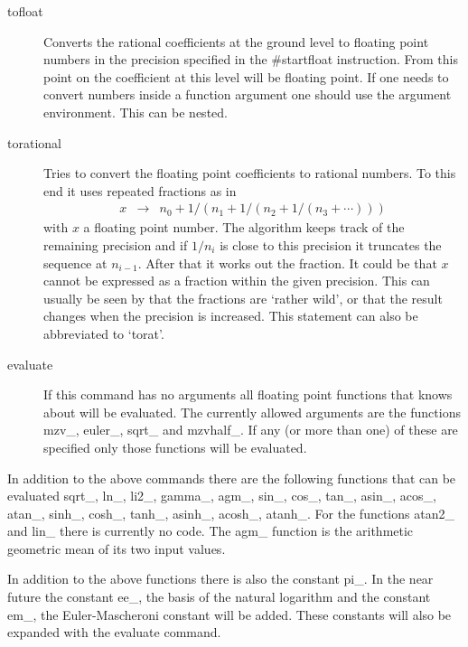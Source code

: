 \begin{description}
\item[tofloat] Converts the rational coefficients at the ground level to 
floating point numbers in the precision specified in the \#startfloat 
instruction. From this point on the coefficient at this level will be 
floating point. If one needs to convert numbers inside a function argument 
one should use the argument environment. This can be nested.
\item[torational] Tries to convert the floating point coefficients to 
rational numbers. To this end it uses repeated fractions as in
\begin{eqnarray}
	x & \rightarrow & n_0 + 1/(n_1+1/(n_2+1/(n_3+\cdots))) \nonumber
\end{eqnarray}
with $x$ a floating point number. The algorithm keeps track of the 
remaining precision and if $1/n_i$ is close to this precision it truncates 
the sequence at $n_{i-1}$. After that it works out the fraction. It could 
be that $x$ cannot be expressed as a fraction within the given precision. 
This can usually be seen by that the fractions are `rather wild', or that 
the result changes when the precision is increased. This statement can also 
be abbreviated to `torat'.
\item[evaluate] If this command has no arguments all floating point 
functions that \FORM{} knows about will be evaluated. The currently allowed 
arguments are the functions mzv\_, euler\_, sqrt\_ and mzvhalf\_. If any 
(or more than one) of these are specified only those functions will be 
evaluated.
\end{description}
In addition to the above commands there are the following functions that 
can be evaluated sqrt\_, ln\_, li2\_, gamma\_, agm\_, sin\_, cos\_, tan\_,
asin\_, acos\_, atan\_, sinh\_, cosh\_, tanh\_, asinh\_, acosh\_, atanh\_.
For the functions atan2\_ and lin\_ there is currently no code.
The agm\_ function is the arithmetic geometric mean of its two input 
values.

In addition to the above functions there is also the constant pi\_. In the 
near future the constant ee\_, the basis of the natural logarithm and the 
constant em\_, the Euler-Mascheroni constant will be added. These constants 
will also be expanded with the evaluate command.

